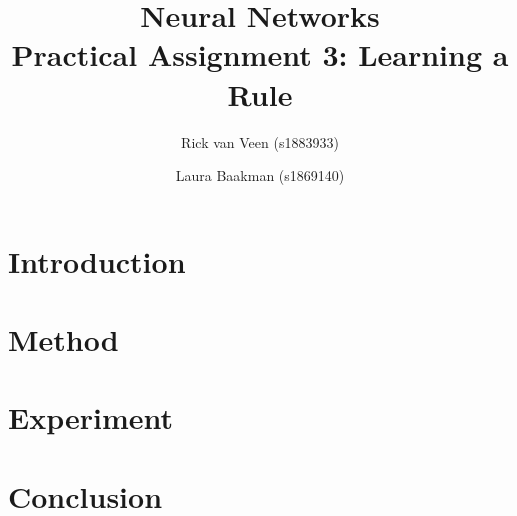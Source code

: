 \documentclass[twoside, a4paper, twocolumn]{article}
\title{Neural Networks\\Practical Assignment 3: Learning a Rule}
\author{Rick van Veen (s1883933) \and Laura Baakman (s1869140)}
\begin{document}
\twocolumn[\maketitle]





\section{Introduction}

	
\section{Method}
\label{s:method}
	

\section{Experiment}
	

\section{Conclusion}


\printbibliography

\end{document}

